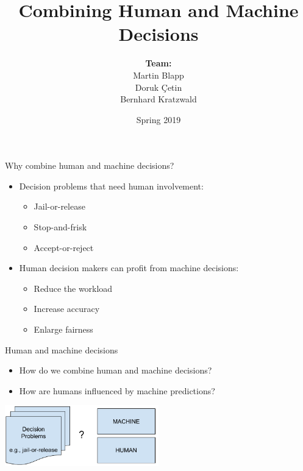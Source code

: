 \documentclass[11pt]{beamer}
\begin{document}
\author[]{\begin{tabular}{c} 
\\ \textbf{Team:} \\
{\small Martin Blapp}\\
{\small Doruk Çetin}\\
{\small Bernhard Kratzwald}\\
\end{tabular}}

\date{Spring 2019}

\title{Combining Human and Machine Decisions}


\begin{frame}{Why combine human and machine decisions?}
\begin{itemize}
	\setlength\itemsep{1em}
	\item Decision problems that need human involvement:
	\begin{itemize}
	\item Jail-or-release
	\item Stop-and-frisk
	\item Accept-or-reject 
	\end{itemize}
	\item Human decision makers can profit from machine decisions:
		\begin{itemize}
		\item Reduce the workload
		\item Increase accuracy
		\item Enlarge fairness
	\end{itemize}
\end{itemize}
\end{frame}

\begin{frame}{Human and machine decisions}
\begin{itemize}
	\item How do we combine human and machine decisions?
	\item How are humans influenced by machine predictions? 
\end{itemize}
\centering
\includegraphics[width=0.5\textwidth]{Figures/problem_statement.pdf}
\end{frame}
\end{document}
